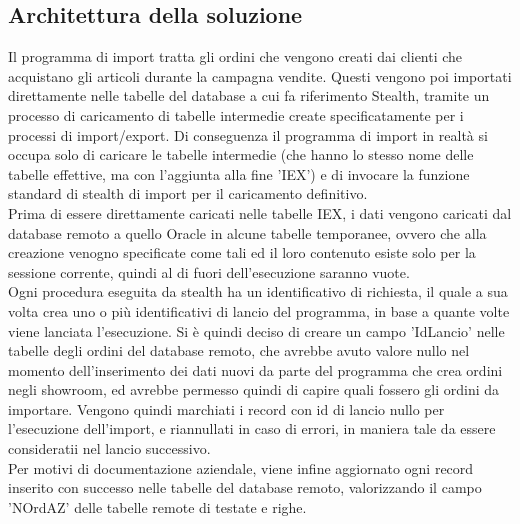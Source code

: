 \subsection{Architettura della soluzione}
Il programma di import tratta gli ordini che vengono creati dai clienti che acquistano gli articoli durante la campagna vendite. Questi vengono poi importati direttamente nelle tabelle del database a cui fa riferimento Stealth, tramite un processo di caricamento di tabelle intermedie create specificatamente per i processi di import/export. Di conseguenza il programma di import in realtà si occupa solo di caricare le tabelle intermedie (che hanno lo stesso nome delle tabelle effettive, ma con l'aggiunta alla fine 'IEX') e di invocare la funzione standard di stealth di import per il caricamento definitivo.\\
Prima di essere direttamente caricati nelle tabelle IEX, i dati vengono caricati dal database remoto a quello Oracle in alcune tabelle temporanee, ovvero che alla creazione venogno specificate come tali ed il loro contenuto esiste solo per la sessione corrente, quindi al di fuori dell'esecuzione saranno vuote.\\
Ogni procedura eseguita da stealth ha un identificativo di richiesta, il quale a sua volta crea uno o più identificativi di lancio del programma, in base a quante volte viene lanciata l'esecuzione. Si è quindi deciso di creare un campo 'IdLancio' nelle tabelle degli ordini del database remoto, che avrebbe avuto valore nullo nel momento dell'inserimento dei dati nuovi da parte del programma che crea ordini negli showroom, ed avrebbe permesso quindi di capire quali fossero gli ordini da importare. Vengono quindi marchiati i record con id di lancio nullo per l'esecuzione dell'import, e riannullati in caso di errori, in maniera tale da essere consideratii nel lancio successivo.\\
Per motivi di documentazione aziendale, viene infine aggiornato ogni record inserito con successo nelle tabelle del database remoto, valorizzando il campo 'NOrdAZ' delle tabelle remote di testate e righe.
\newpage
